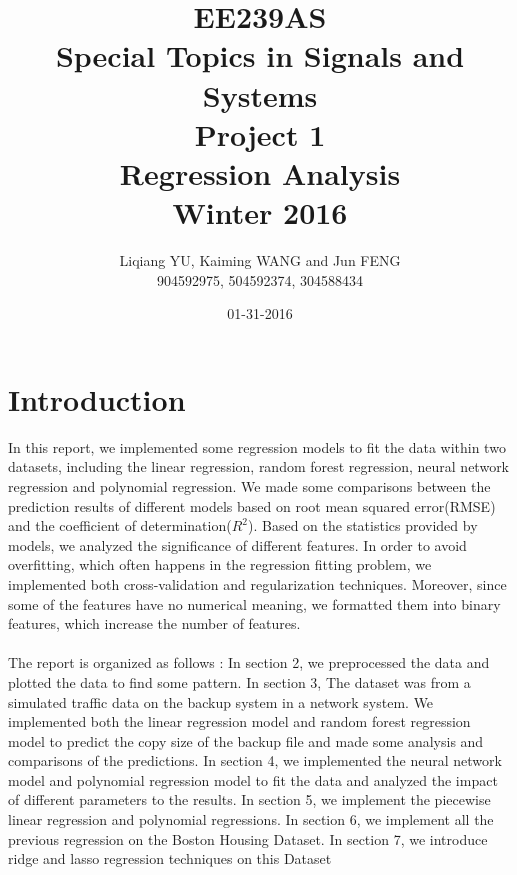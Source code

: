 \documentclass{article}
\begin{document}
\begin{titlepage}
\title{EE\quad239AS \\Special Topics in Signals and Systems\\Project 1\\Regression Analysis\\Winter 2016} 
\author{Liqiang YU, Kaiming WANG and Jun FENG\\
904592975, 504592374, 304588434} 
\date{01-31-2016}
\end{titlepage}

\maketitle
\tableofcontents
\newpage
\section{Introduction}
In this report, we implemented some regression models to fit the data within two datasets, including the linear regression, random forest regression, neural network regression and polynomial regression. We made some comparisons between the prediction results of different models based on root mean squared error(RMSE) and the coefficient of determination($R^2$).
Based on the statistics provided by models, we analyzed the significance of different features. In order to avoid overfitting, which often happens in the regression fitting problem, we implemented both cross-validation and regularization techniques. Moreover, since some of the features have no numerical meaning, we formatted them into binary features, which increase the number of features. \\
\\
The report is organized as follows : In section 2, we preprocessed the data and plotted the data to find some pattern. In section 3, The dataset was from a simulated traffic data on the backup system in a network system. We implemented both the linear regression model and random forest regression model to predict the copy size of the backup file and made some analysis and comparisons of the predictions. In section 4, we implemented the neural network model and polynomial regression model to fit the data and analyzed the impact of different parameters to the results. In section 5, we implement the piecewise linear regression and polynomial regressions. In section 6, we implement all the previous regression on the Boston Housing Dataset. In section 7, we introduce ridge and lasso regression techniques on this Dataset 
\end{document}
